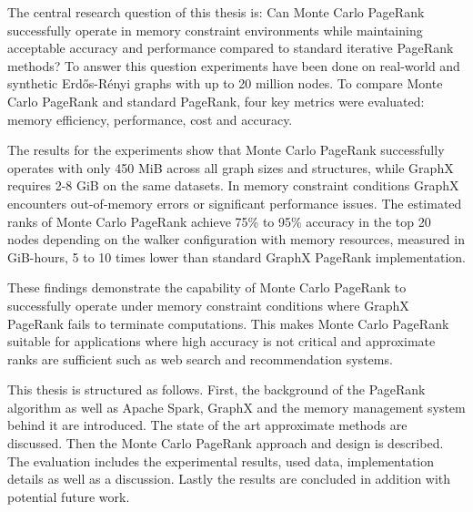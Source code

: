 The central research question of this thesis is: Can Monte Carlo PageRank successfully operate in memory constraint environments while maintaining acceptable accuracy and performance compared to standard iterative PageRank methods?
To answer this question experiments have been done on real-world and synthetic Erdős-Rényi graphs with up to 20 million nodes. To compare Monte Carlo PageRank and standard PageRank, four key metrics were evaluated: memory efficiency, performance, cost and accuracy. 
\par

The results for the experiments show that Monte Carlo PageRank successfully operates with only 450 MiB across all graph sizes and structures, while GraphX requires 2-8 GiB on the same datasets. In memory constraint conditions GraphX encounters out-of-memory errors or significant performance issues. The estimated ranks of Monte Carlo PageRank achieve 75\% to 95\% accuracy in the top 20 nodes depending on the walker configuration with memory resources, measured in GiB-hours, 5 to 10 times lower than standard GraphX PageRank implementation. \par

These findings demonstrate the capability of Monte Carlo PageRank to successfully operate under memory constraint conditions where GraphX PageRank fails to terminate computations. This makes Monte Carlo PageRank suitable for applications where high accuracy is not critical and approximate ranks are sufficient such as web search and recommendation systems. \par

This thesis is structured as follows. First, the background of the PageRank algorithm as well as Apache Spark, GraphX and the memory management system behind it are introduced. The state of the art approximate methods are discussed. Then the Monte Carlo PageRank approach and design is described. The evaluation includes the experimental results, used data, implementation details as well as a discussion. Lastly the results are concluded in addition with potential future work.

